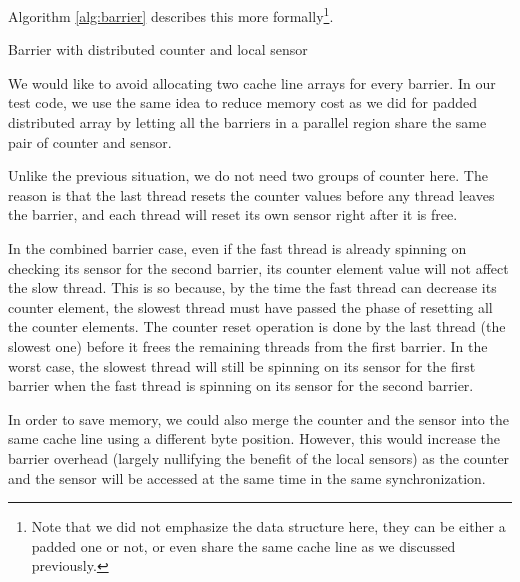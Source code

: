 Algorithm \ref{alg:barrier} describes this more
formally\footnote{Note that we did not emphasize the data structure
  here, they can be either a padded one or not, or even share the same
  cache line as we discussed previously.}.

\begin{algorithm}[h]
  \SetLine
  \BlankLine
  \caption{Barrier with distributed counter and local sensor}
  \label{alg:barrier}
\end{algorithm}

We would like to avoid allocating two cache line arrays for every
barrier.  In our test code, we use the same idea to reduce memory cost
as we did for padded distributed array by letting all the barriers in
a parallel region share the same pair of counter and sensor. 

Unlike the previous situation, we do not need two groups of counter
here.  The reason is that the last thread resets the counter values
before any thread leaves the barrier, and each thread will reset its
own sensor right after it is free.

In the combined barrier case, even if the fast thread is already
spinning on checking its sensor for the second barrier, its counter
element value will not affect the slow thread. This is so because, by
the time the fast thread can decrease its counter element, the slowest
thread must have passed the phase of resetting all the counter
elements.  The counter reset operation is done by the last thread (the
slowest one) before it frees the remaining threads from the first
barrier. In the worst case, the slowest thread will still be spinning
on its sensor for the first barrier when the fast thread is spinning
on its sensor for the second barrier.

In order to save memory, we could also merge the counter and the
sensor into the same cache line using a different byte position.
However, this would increase the barrier overhead (largely nullifying
the benefit of the local sensors) as the counter and the sensor will
be accessed at the same time in the same synchronization.

